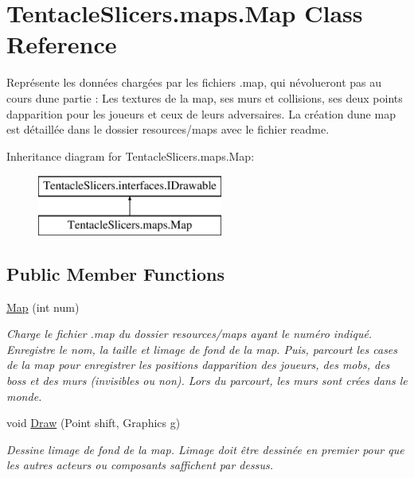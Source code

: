 \hypertarget{class_tentacle_slicers_1_1maps_1_1_map}{}\section{Tentacle\+Slicers.\+maps.\+Map Class Reference}
\label{class_tentacle_slicers_1_1maps_1_1_map}


Représente les données chargées par les fichiers .map, qui n\textquotesingle{}évolueront pas au cours d\textquotesingle{}une partie \+: Les textures de la map, ses murs et collisions, ses deux points d\textquotesingle{}apparition pour les joueurs et ceux de leurs adversaires. La création d\textquotesingle{}une map est détaillée dans le dossier resources/maps avec le fichier readme.  


Inheritance diagram for Tentacle\+Slicers.\+maps.\+Map\+:\begin{figure}[H]
\begin{center}
\leavevmode
\includegraphics[height=2.000000cm]{class_tentacle_slicers_1_1maps_1_1_map}
\end{center}
\end{figure}
\subsection*{Public Member Functions}
\begin{DoxyCompactItemize}
\item 
\hyperlink{class_tentacle_slicers_1_1maps_1_1_map_a277eb8c716c31557142ab758f8c1c701}{Map} (int num)
\begin{DoxyCompactList}\small\item\em Charge le fichier .map du dossier resources/maps ayant le numéro indiqué. Enregistre le nom, la taille et l\textquotesingle{}image de fond de la map. Puis, parcourt les cases de la map pour enregistrer les positions d\textquotesingle{}apparition des joueurs, des mobs, des boss et des murs (invisibles ou non). Lors du parcourt, les murs sont crées dans le monde. \end{DoxyCompactList}\item 
void \hyperlink{class_tentacle_slicers_1_1maps_1_1_map_ac3ae7e9bb364c2cdf5d718315dd3fc3f}{Draw} (Point shift, Graphics g)
\begin{DoxyCompactList}\small\item\em Dessine l\textquotesingle{}image de fond de la map. L\textquotesingle{}image doit être dessinée en premier pour que les autres acteurs ou composants s\textquotesingle{}affichent par dessus. \end{DoxyCompactList}\end{DoxyCompactItemize}
